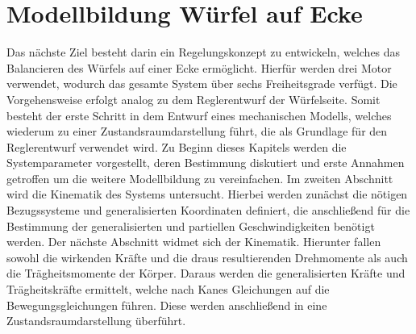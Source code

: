 \ifx\FORMAT\undefined


\fi

\chapter{Modellbildung Würfel auf Ecke}
Das nächste Ziel besteht darin ein Regelungskonzept zu entwickeln, welches das Balancieren des Würfels auf einer Ecke ermöglicht. Hierfür werden drei Motor verwendet, wodurch das gesamte System über sechs Freiheitsgrade verfügt. Die Vorgehensweise erfolgt analog zu dem Reglerentwurf der Würfelseite. Somit besteht der erste Schritt in dem Entwurf eines mechanischen Modells, welches wiederum zu einer Zustandsraumdarstellung führt, die als Grundlage für den Reglerentwurf verwendet wird.
Zu Beginn dieses Kapitels werden die Systemparameter vorgestellt, deren Bestimmung diskutiert und erste Annahmen getroffen um die weitere Modellbildung zu vereinfachen. Im zweiten Abschnitt wird die Kinematik des Systems untersucht. Hierbei werden zunächst die nötigen Bezugssysteme und generalisierten Koordinaten definiert, die anschließend für die Bestimmung der generalisierten und partiellen Geschwindigkeiten benötigt werden.
Der nächste Abschnitt widmet sich der Kinematik. Hierunter fallen sowohl die wirkenden Kräfte und die draus resultierenden Drehmomente als auch die Trägheitsmomente der Körper. Daraus werden die generalisierten Kräfte und Trägheitskräfte ermittelt, welche nach Kanes Gleichungen auf die Bewegungsgleichungen führen. Diese werden anschließend in eine Zustandsraumdarstellung überführt.
\newpage

\newpage

\newpage


\ifx\FORMAT\undefined

\fi